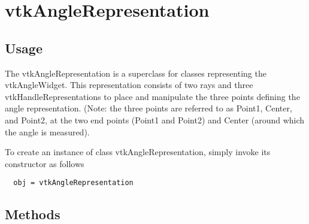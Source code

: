 \section{vtkAngleRepresentation}

\subsection{Usage}

 The vtkAngleRepresentation is a superclass for classes representing the
 vtkAngleWidget. This representation consists of two rays and three
 vtkHandleRepresentations to place and manipulate the three points defining
 the angle representation. (Note: the three points are referred to as Point1,
 Center, and Point2, at the two end points (Point1 and Point2) and Center
 (around which the angle is measured).

To create an instance of class vtkAngleRepresentation, simply
invoke its constructor as follows
\begin{verbatim}
  obj = vtkAngleRepresentation
\end{verbatim}
\subsection{Methods}

